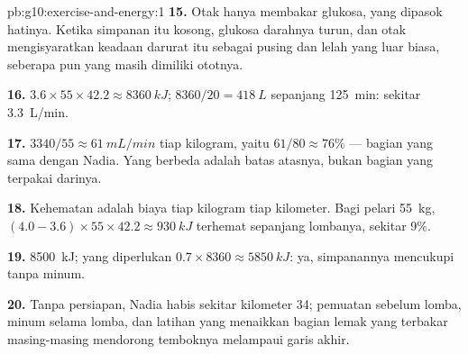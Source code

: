 \begin{solution}{pb:g10:exercise-and-energy:1}
\textbf{15.} Otak hanya membakar glukosa, yang dipasok 
hatinya. Ketika simpanan itu kosong, glukosa darahnya turun, dan otak
mengisyaratkan keadaan darurat itu sebagai pusing dan lelah yang luar
biasa, seberapa pun yang masih dimiliki ototnya.

\textbf{16.} $3.6 \times 55 \times 42.2 \approx \qty{8360}{kJ}$;
$8360/20 = \qty{418}{L}$ sepanjang \qty{125}{min}: sekitar \qty{3.3}{L/min}.

\textbf{17.} $3340/55 \approx \qty{61}{mL/min}$ tiap kilogram, yaitu
$61/80 \approx 76\%$ --- bagian yang sama dengan Nadia. Yang berbeda
adalah batas atasnya, bukan bagian yang terpakai darinya.

\textbf{18.} Kehematan adalah biaya tiap kilogram tiap kilometer. Bagi
pelari \qty{55}{kg}, $(4.0 - 3.6) \times 55 \times 42.2 \approx
\qty{930}{kJ}$ terhemat sepanjang lombanya, sekitar 9\%.

\textbf{19.}  \qty{8500}{kJ};  yang diperlukan $0.7 \times
8360 \approx \qty{5850}{kJ}$: ya, simpanannya mencukupi tanpa minum.

\textbf{20.} Tanpa persiapan,  Nadia habis sekitar kilometer
34; pemuatan  sebelum lomba, minum  selama lomba,
dan latihan yang menaikkan bagian lemak yang terbakar masing-masing
mendorong temboknya melampaui garis akhir.
\end{solution}
